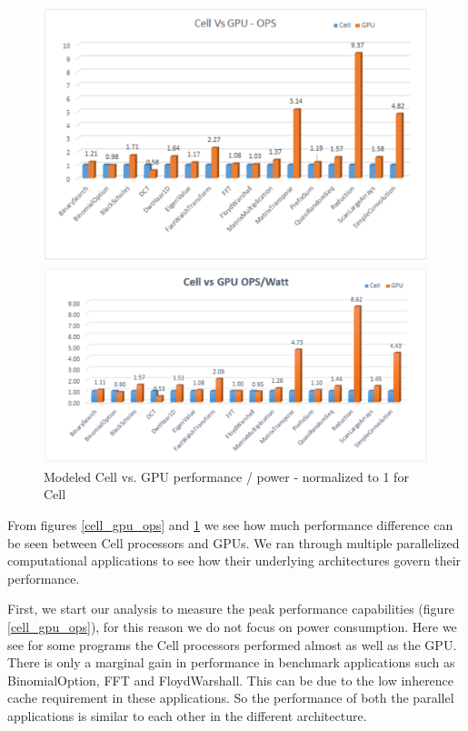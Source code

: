 \documentclass{sig-alternate-05-2015}
\begin{document}
\begin{figure}
\centering
\includegraphics[scale=0.8]{./cell_gpu_ops}
\caption{Modeled Cell vs. GPU performance - normalized to 1 for Cell}
\label{cell_gpu_ops}

\centering
\includegraphics[scale=0.8]{./cell_gpu_opsperwatt}
\caption{Modeled Cell vs. GPU performance / power - normalized to 1 for Cell}
\label{cell_gpu_opsperwatt}
\end{figure}


From figures \ref{cell_gpu_ops} and \ref{cell_gpu_opsperwatt} we see how much performance difference can be seen between Cell processors and GPUs. We ran through multiple parallelized computational applications to see how their underlying architectures govern their performance. 

First, we start our analysis to measure the peak performance capabilities (figure \ref{cell_gpu_ops}), for this reason we do not focus on power consumption.  Here we see for some programs the Cell processors performed almost as well as the GPU. There is only a marginal gain in performance in benchmark applications such as BinomialOption, FFT and FloydWarshall. This can be due to the low inherence cache requirement in these applications. So the performance of both the parallel applications is similar to each other in the different architecture. 
\end{document}
